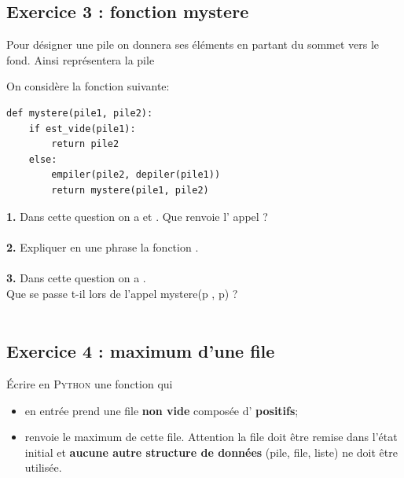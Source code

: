 \documentclass[article,a4paper,firamath,12pt]{nsi}
\begin{document}

\subsection*{Exercice 3 : fonction mystere}
Pour désigner une pile on donnera ses éléments en partant du sommet vers le fond. Ainsi  représentera la pile 
\begin{center}
\end{center}

On considère la fonction suivante:

\begin{pyc}
    \begin{verbatim}
def mystere(pile1, pile2):
    if est_vide(pile1):
        return pile2
    else:
        empiler(pile2, depiler(pile1))       
        return mystere(pile1, pile2)       
    \end{verbatim}
\end{pyc}


\textbf{1.} Dans cette question on a  et . Que renvoie l' appel  ?\\

\\

\textbf{2.} Expliquer en une phrase la fonction .\\

\\

\textbf{3.} Dans cette question on a .\\
Que se passe t-il lors de l'appel mystere(p , p) ?\\

\\

\subsection*{Exercice 4 : maximum d'une file}
\'Ecrire en \textsc{Python} une fonction  qui
\begin{itemize}
    \item 	en entrée prend une file \textbf{non vide} composée d' \textbf{positifs};
    \item 	renvoie le maximum de cette file. Attention la file doit être remise dans l'état initial et \textbf{aucune autre structure de données} (pile, file, liste) ne doit être utilisée.
\end{itemize}
\end{document}
